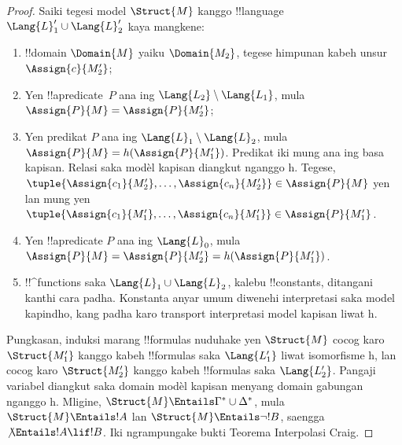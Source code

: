 \documentclass[../../../include/open-logic-section]{subfiles}
\begin{document}
\begin{proof}
Saiki tegesi model $\Struct{M}$ kanggo !!{language}
$\Lang{L}'_1 \cup \Lang{L}'_2$ kaya mangkene:
\begin{enumerate}
\item !!{domain} $\Domain{M}$ yaiku $\Domain{M_2}$,
  tegese himpunan kabeh unsur $\Assign{c}{M'_2}$;
\item Yen !!a{predicate}~$P$ ana ing $\Lang{L_2} \setminus
  \Lang{L_1}$, mula $\Assign{P}{M} = \Assign{P}{M'_2}$;
\item Yen predikat $P$ ana ing $\Lang{L}_1\setminus \Lang{L}_2$,
  mula $\Assign{P}{M} = h(\Assign{P}{M'_1})$.
  Predikat iki mung ana ing basa kapisan. Relasi saka modèl kapisan diangkut nganggo h.
  Tegese, $\tuple{\Assign{c_1}{M'_2}, \dots,
  \Assign{c_n}{M'_2}} \in \Assign{P}{M}$ yen lan mung yen
  $\tuple{\Assign{c_1}{M'_1}, \dots,
  \Assign{c_n}{M'_1}} \in \Assign{P}{M'_1}$.
\item Yen !!a{predicate} $P$ ana ing $\Lang{L}_0$,
  mula $\Assign{P}{M} = \Assign{P}{M'_2} =
  h(\Assign{P}{M'_1})$.
\item !!^{function}s saka $\Lang{L}_1 \cup \Lang{L}_2$,
  kalebu !!{constant}s, ditangani kanthi cara padha. Konstanta anyar umum diwenehi interpretasi saka model kapindho, kang padha karo transport interpretasi model kapisan liwat h.
\end{enumerate}

Pungkasan, induksi marang !!{formula}s nuduhake yen
$\Struct{M}$ cocog karo $\Struct{M'_1}$ kanggo kabeh
!!{formula}s saka $\Lang{L'_1}$ liwat isomorfisme h,
lan cocog karo $\Struct{M'_2}$ kanggo kabeh
!!{formula}s saka $\Lang{L'_2}$.
Pangaji variabel diangkut saka domain modèl kapisan menyang domain gabungan nganggo h.
Mligine, $\Struct{M} \Entails \Gamma^* \cup \Delta^*$,
mula $\Struct{M} \Entails !A$ lan
$\Struct{M} \Entails \lnot!B$, saengga
$\not\Entails !A \lif !B$. Iki ngrampungake bukti
Teorema Interpolasi Craig.
\end{proof}
\end{document}
